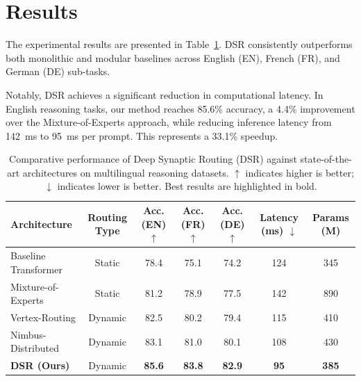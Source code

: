 \section{Results}
\label{sec:results}
The experimental results are presented in Table~\ref{tab:results}. DSR consistently outperforms both monolithic and modular baselines across English (EN), French (FR), and German (DE) sub-tasks.

Notably, DSR achieves a significant reduction in computational latency. In English reasoning tasks, our method reaches 85.6\% accuracy, a 4.4\% improvement over the Mixture-of-Experts approach, while reducing inference latency from 142~ms to 95~ms per prompt. This represents a 33.1\% speedup.

\begin{table}[t]
  \centering
  \small
  \begin{tabular}{lcccccc}
    \toprule
    \textbf{Architecture} & \textbf{Routing Type} & \textbf{Acc. (EN) $\uparrow$} & \textbf{Acc. (FR) $\uparrow$} & \textbf{Acc. (DE) $\uparrow$} & \textbf{Latency (ms) $\downarrow$} & \textbf{Params (M)} \\
    \midrule
    Baseline Transformer & Static & 78.4 & 75.1 & 74.2 & 124 & 345 \\
    Mixture-of-Experts   & Static & 81.2 & 78.9 & 77.5 & 142 & 890 \\
    Vertex-Routing       & Dynamic & 82.5 & 80.2 & 79.4 & 115 & 410 \\
    Nimbus-Distributed   & Dynamic & 83.1 & 81.0 & 80.1 & 108 & 430 \\
    \midrule
    \textbf{DSR (Ours)}  & Dynamic & \textbf{85.6} & \textbf{83.8} & \textbf{82.9} & \textbf{95} & \textbf{385} \\
    \bottomrule
  \end{tabular}
  \caption{Comparative performance of Deep Synaptic Routing (DSR) against state-of-the-art architectures on multilingual reasoning datasets. $\uparrow$ indicates higher is better; $\downarrow$ indicates lower is better. Best results are highlighted in bold.}
  \label{tab:results}
\end{table}
